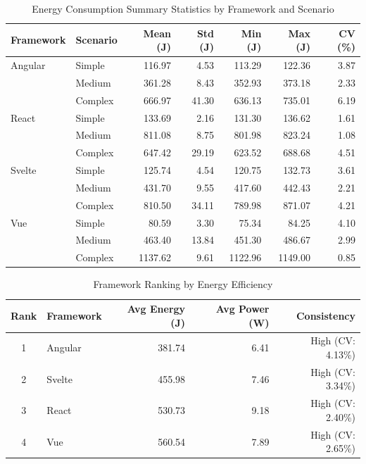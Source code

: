 
\begin{table}[htbp]
\centering
\caption{Energy Consumption Summary Statistics by Framework and Scenario}
\label{tab:energy_summary}
\begin{tabular}{llrrrrr}
\toprule
\textbf{Framework} & \textbf{Scenario} & \textbf{Mean (J)} & \textbf{Std (J)} & \textbf{Min (J)} & \textbf{Max (J)} & \textbf{CV (\%)} \\
\midrule
Angular    & Simple   &  116.97 &   4.53 &  113.29 &  122.36 &  3.87 \\
           & Medium   &  361.28 &   8.43 &  352.93 &  373.18 &  2.33 \\
           & Complex  &  666.97 &  41.30 &  636.13 &  735.01 &  6.19 \\
\midrule
React      & Simple   &  133.69 &   2.16 &  131.30 &  136.62 &  1.61 \\
           & Medium   &  811.08 &   8.75 &  801.98 &  823.24 &  1.08 \\
           & Complex  &  647.42 &  29.19 &  623.52 &  688.68 &  4.51 \\
\midrule
Svelte     & Simple   &  125.74 &   4.54 &  120.75 &  132.73 &  3.61 \\
           & Medium   &  431.70 &   9.55 &  417.60 &  442.43 &  2.21 \\
           & Complex  &  810.50 &  34.11 &  789.98 &  871.07 &  4.21 \\
\midrule
Vue        & Simple   &   80.59 &   3.30 &   75.34 &   84.25 &  4.10 \\
           & Medium   &  463.40 &  13.84 &  451.30 &  486.67 &  2.99 \\
           & Complex  & 1137.62 &   9.61 & 1122.96 & 1149.00 &  0.85 \\
\bottomrule
\end{tabular}
\end{table}


\begin{table}[htbp]
\centering
\caption{Framework Ranking by Energy Efficiency}
\label{tab:framework_ranking}
\begin{tabular}{clrrr}
\toprule
\textbf{Rank} & \textbf{Framework} & \textbf{Avg Energy (J)} & \textbf{Avg Power (W)} & \textbf{Consistency} \\
\midrule
1 & Angular  &  381.74 &   6.41 & High (CV: 4.13\%) \\
2 & Svelte   &  455.98 &   7.46 & High (CV: 3.34\%) \\
3 & React    &  530.73 &   9.18 & High (CV: 2.40\%) \\
4 & Vue      &  560.54 &   7.89 & High (CV: 2.65\%) \\
\bottomrule
\end{tabular}
\end{table}


